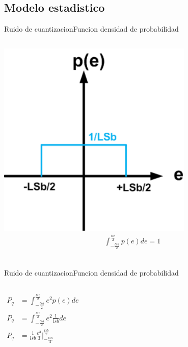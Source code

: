 \begin{darkframes}
   \subsection{Modelo estadistico}
   \begin{frame}{Ruido de cuantizacion}{Funcion densidad de probabilidad}
      \begin{columns}[onlytextwidth]
         \center\includegraphics[width=0.7\textwidth]{1_clase/noise_funcion_probabilidad}
         \begin{align*}
            \int^\frac{lsb}{2}_{-\frac{lsb}{2}} p(e) de = 1 \\
         \end{align*}
      \end{columns}
      \vfill
   \end{frame}
   \begin{frame}{Ruido de cuantizacion}{Funcion densidad de probabilidad}
      \begin{columns}[onlytextwidth]
         \begin{align*}
            P_q &= \int^\frac{lsb}{2}_{-\frac{lsb}{2}} e^2 p(e) de \\
            P_q &= \int^\frac{lsb}{2}_{-\frac{lsb}{2}} e^2 \frac{1}{lsb} de \\
            P_q &= \frac{1}{lsb} \frac{e^3}{3} \Big\rvert^{\frac{lsb}{2}}_{-\frac{lsb}{2}}
         \end{align*}
         \begin{align*}

\end{align*}
\end{columns}
\end{frame}
\end{darkframes}
